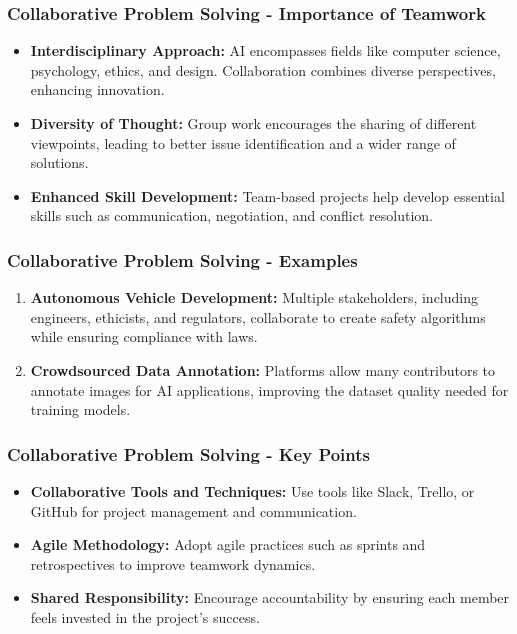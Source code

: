\documentclass[aspectratio=169]{beamer}
\begin{document}
\begin{frame}[fragile]
    \frametitle{Collaborative Problem Solving - Importance of Teamwork}
    \begin{itemize}
        \item \textbf{Interdisciplinary Approach:} AI encompasses fields like computer science, psychology, ethics, and design. Collaboration combines diverse perspectives, enhancing innovation.
        \item \textbf{Diversity of Thought:} Group work encourages the sharing of different viewpoints, leading to better issue identification and a wider range of solutions.
        \item \textbf{Enhanced Skill Development:} Team-based projects help develop essential skills such as communication, negotiation, and conflict resolution.
    \end{itemize}
\end{frame}

\begin{frame}[fragile]
    \frametitle{Collaborative Problem Solving - Examples}
    \begin{enumerate}
        \item \textbf{Autonomous Vehicle Development:} 
        Multiple stakeholders, including engineers, ethicists, and regulators, collaborate to create safety algorithms while ensuring compliance with laws.
        
        \item \textbf{Crowdsourced Data Annotation:} 
        Platforms allow many contributors to annotate images for AI applications, improving the dataset quality needed for training models.
    \end{enumerate}
\end{frame}

\begin{frame}[fragile]
    \frametitle{Collaborative Problem Solving - Key Points}
    \begin{itemize}
        \item \textbf{Collaborative Tools and Techniques:} Use tools like Slack, Trello, or GitHub for project management and communication.
        \item \textbf{Agile Methodology:} Adopt agile practices such as sprints and retrospectives to improve teamwork dynamics.
        \item \textbf{Shared Responsibility:} Encourage accountability by ensuring each member feels invested in the project's success.
    \end{itemize}
\end{frame}
\end{document}
